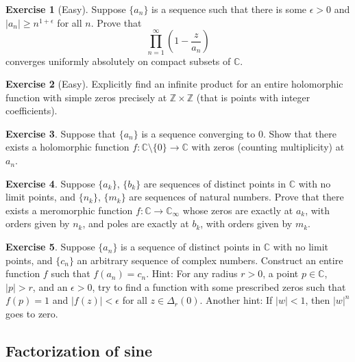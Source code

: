 \documentclass[12pt,openany]{book}
\newcommand{\sabs}[1]{\lvert {#1} \rvert}
\newcommand{\C}{{\mathbb{C}}}
\newcommand{\Z}{{\mathbb{Z}}}
\theoremstyle{plain}
\theoremstyle{remark}
\theoremstyle{definition}
\newenvironment{exbox}{%
    \def\FrameCommand{\vrule width 1pt \relax\hspace{10pt}}%
    \MakeFramed{\advance\hsize-\width\FrameRestore}%
}{%
    \endMakeFramed
}
\theoremstyle{exercise}
\newtheorem{exercise}{Exercise}[section]
\theoremstyle{example}
\begin{document}
\begin{exbox}
\begin{exercise}[Easy]
Suppose $\{ a_n \}$ is a sequence such that there is some $\epsilon>0$ and
$\sabs{a_n} \geq n^{1+\epsilon}$ for all $n$.  Prove that
\begin{equation*}
\prod_{n=1}^\infty
\left(1-\frac{z}{a_n} \right)
\end{equation*}
converges uniformly absolutely on compact subsets of $\C$.
\end{exercise}

\begin{exercise}[Easy]
Explicitly find an infinite product for an entire holomorphic function
with simple zeros precisely at $\Z \times \Z$ (that is points with integer
coefficients).
\end{exercise}

\begin{exercise}
Suppose that $\{ a_n \}$ is a sequence converging to $0$.  Show that there
exists a holomorphic function $f \colon \C \setminus \{ 0 \} \to \C$
with zeros (counting multiplicity) at $a_n$.
\end{exercise}

\begin{exercise}
Suppose $\{ a_k \}$, $\{ b_k \}$ are
sequences of distinct points in $\C$
with no limit points, and $\{ n_k \}$, $\{ m_k \}$ are sequences of
natural numbers.
Prove that
there exists a meromorphic function $f \colon \C \to \C_\infty$ whose
zeros are exactly at $a_k$, with orders given by $n_k$, and
poles are exactly at $b_k$, with orders given by $m_k$.
\end{exercise}

\begin{exercise}
Suppose $\{ a_n \}$ is a sequence of distinct points in $\C$
with no limit points, and $\{ c_n \}$ an arbitrary sequence of complex
numbers.  Construct an entire function $f$ such that $f(a_n) = c_n$.
Hint:  For any radius $r > 0$, a point $p \in \C$, $\sabs{p} > r$, and
an $\epsilon > 0$, try to find a function with some prescribed zeros
such that $f(p) =1$ and $\sabs{f(z)} < \epsilon$ for all $z \in \Delta_r(0)$.
Another hint:
If $\sabs{w} < 1$, then $\sabs{w}^n$ goes to zero.
\end{exercise}
\end{exbox}

\subsection{Factorization of sine}
\end{document}
